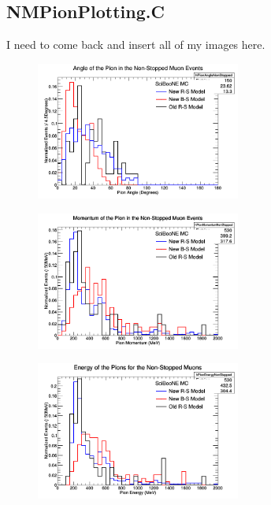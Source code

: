 \documentclass[11pt]{article}
\begin{document}
\subsection{NMPionPlotting.C}
I need to come back and insert all of my images here.

\begin{figure}[H]
\centering
\includegraphics[width=0.6\textwidth]{NMPionPlottingImages/1-NMPionPlotting.png}
\caption{}
\end{figure}

\begin{figure}[H]
\centering
\includegraphics[width=0.6\textwidth]{NMPionPlottingImages/2-NMPionPlotting.png}
\caption{}
\end{figure}

\begin{figure}[H]
\centering
\includegraphics[width=0.6\textwidth]{NMPionPlottingImages/3-NMPionPlotting.png}
\caption{}
\end{figure}
\end{document}

